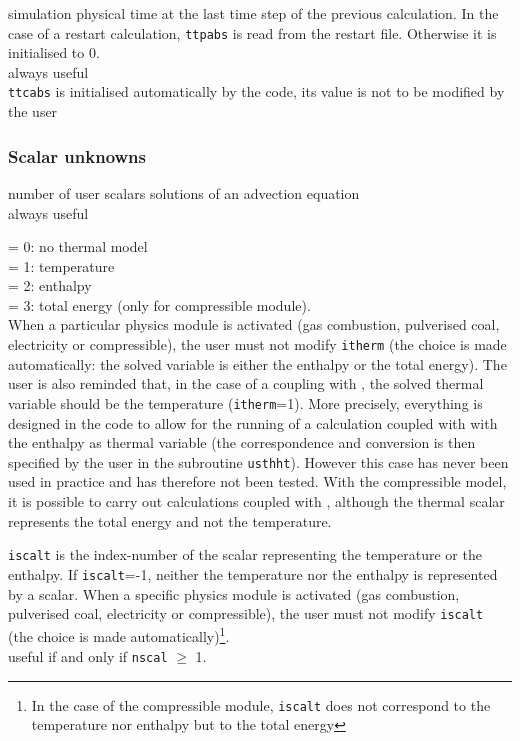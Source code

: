 {simulation physical time at the last time step of the previous
calculation. In the case of a restart calculation, {\tt ttpabs} is read from
the restart file. Otherwise it is initialised to 0.\\
always useful\\
{\tt ttcabs} is initialised automatically by the code, its value is not to
be modified by the user}

\subsubsection{Scalar unknowns}

{number of user scalars solutions of an advection equation\\
always useful}

{\hspace*{1.3cm}= 0: no thermal model\\
\hspace*{1.3cm}= 1: temperature\\
\hspace*{1.3cm}= 2: enthalpy\\
\hspace*{1.3cm}= 3: total energy (only for compressible module).\\
When a particular physics module is activated (gas combustion, pulverised coal,
electricity or compressible), the user must not modify {\tt itherm} (the choice
is made automatically: the solved variable is either the enthalpy or the total
energy). The user is also reminded that, in the case of a coupling with
\syrthes, the solved thermal variable should be the temperature
({\tt itherm}=1).
More precisely, everything is designed in the code to allow for the
running of a calculation coupled with \syrthes with the enthalpy as thermal
variable (the correspondence and conversion is then specified by the user in
the subroutine \texttt{usthht}).
However this case has never been used in practice and has therefore not been
tested. With the compressible model, it is possible to carry out calculations
coupled with \syrthes, although the thermal scalar represents the total
energy and not the temperature.}

{{\tt iscalt} is the index-number of the scalar
representing the temperature or the enthalpy. If {\tt iscalt}=-1, neither
the temperature nor the enthalpy is represented by a scalar. When a specific
physics module is activated (gas combustion, pulverised coal,
electricity or compressible),
the user must not modify {\tt iscalt} (the choice is made
automatically)\footnote{In the case of the compressible module, {\tt iscalt}
does not correspond to the temperature nor enthalpy but to the total energy}.\\
useful if and only if {\tt nscal} $\geqslant$ 1.}

